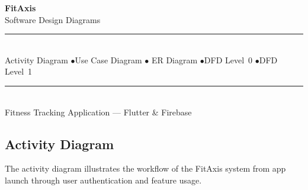 \documentclass[a4paper,12pt]{article}
\begin{document}
\begin{center}
    {\Huge\bfseries FitAxis}\\[8pt]
    {\Large Software Design Diagrams}\\[16pt]
    \rule{0.6\textwidth}{0.5pt}\\[12pt]
    {\normalsize Activity Diagram \quad$\bullet$\quad Use Case Diagram \quad$\bullet$\quad
     ER Diagram \quad$\bullet$\quad DFD Level~0 \quad$\bullet$\quad DFD Level~1}\\[12pt]
    \rule{0.6\textwidth}{0.5pt}\\[8pt]
    {\small Fitness Tracking Application --- Flutter \& Firebase}
\end{center}
\clearpage

\subsection*{Activity Diagram}
The activity diagram illustrates the workflow of the FitAxis system from app launch through user authentication and feature usage.
\end{document}
